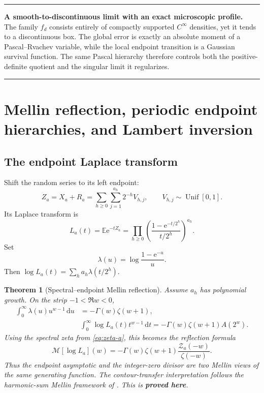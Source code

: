 \documentclass[11pt,oneside]{article}
\numberwithin{equation}{section}
\newtheorem{theorem}{Theorem}[section]
\theoremstyle{definition}
\theoremstyle{remark}
\newcommand{\E}{\mathbb E}
\newcommand{\dd}{\,\mathrm d}
\newcommand{\e}{\mathrm e}
\newcommand{\statusproved}{\textcolor{deepgreen}{\textbf{proved here}}}
\newcommand{\Zspec}{\mathcal Z}
\newcommand{\Mellin}{\mathcal M}
\newenvironment{resultbox}[1]{%
  \par\medskip\noindent\begin{center}\begin{minipage}{0.94\textwidth}%
  \color{deepgreen}\hrule\vspace{0.65em}%
  \color{black}\textbf{\color{deepgreen}#1.}\ }{%
  \par\vspace{0.65em}\color{deepgreen}\hrule
  \end{minipage}\end{center}\medskip}
\begin{document}
\begin{resultbox}{A smooth-to-discontinuous limit with an exact microscopic profile}
The family $f_d$ consists entirely of compactly supported $C^\infty$ densities, yet it tends
to a discontinuous box.  The global error is exactly an absolute moment of a Pascal--Rvachev
variable, while the local endpoint transition is a Gaussian survival function.  The same
Pascal hierarchy therefore controls both the positive-definite quotient and the singular
limit it regularizes.
\end{resultbox}


\section{Mellin reflection, periodic endpoint hierarchies, and Lambert inversion}
\label{sec:mellin}

\subsection{The endpoint Laplace transform}

Shift the random series to its left endpoint:
\begin{equation}
 Z_a=X_a+R_a
 =\sum_{h\ge0}\sum_{j=1}^{a_h}2^{-h}V_{h,j},
 \qquad V_{h,j}\sim\operatorname{Unif}[0,1].
 \label{eq:Za-positive}
\end{equation}
Its Laplace transform is
\begin{equation}
 L_a(t)=\E\e^{-tZ_a}
 =\prod_{h\ge0}
   \left(\frac{1-\e^{-t/2^h}}{t/2^h}\right)^{a_h}.
 \label{eq:La-product}
\end{equation}
Set
\begin{equation}
 \lambda(u)=\log\frac{1-\e^{-u}}u.
 \label{eq:lambda-kernel}
\end{equation}
Then $\log L_a(t)=\sum_ha_h\lambda(t/2^h)$.

\begin{theorem}[Spectral--endpoint Mellin reflection]
\label{thm:mellin-reflection}
Assume $a_h$ has polynomial growth.  On the strip $-1<\Re w<0$,
\begin{align}
 \int_0^\infty\lambda(u)u^{w-1}\dd u
 &=-\Gamma(w)\zeta(w+1),
 \label{eq:kernel-mellin}\\
 &\boxed{\int_0^\infty\log L_a(t)t^{w-1}\dd t
 =-\Gamma(w)\zeta(w+1)A(2^w).}
 \label{eq:La-mellin}
\end{align}
Using the spectral zeta from \eqref{eq:zeta-a}, this becomes the reflection formula
\begin{equation}
 \boxed{
 \Mellin[\log L_a](w)
 =-\Gamma(w)\zeta(w+1)
   \frac{\Zspec_a(-w)}{\zeta(-w)}.}
 \label{eq:mellin-reflection}
\end{equation}
Thus the endpoint asymptotic and the integer-zero divisor are two Mellin views of the same
generating function.  The contour-transfer interpretation follows the harmonic-sum Mellin
framework of \cite{flajolet1995}.  This is \statusproved.
\end{theorem}
\end{document}
